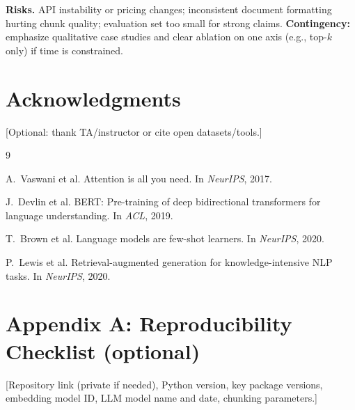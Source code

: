\documentclass[11pt,a4paper]{article}
\begin{document}
\textbf{Risks.} API instability or pricing changes; inconsistent document formatting hurting chunk quality; evaluation set too small for strong claims. \textbf{Contingency:} emphasize qualitative case studies and clear ablation on one axis (e.g., top-$k$ only) if time is constrained.

\section*{Acknowledgments}
[Optional: thank TA/instructor or cite open datasets/tools.]


\begin{thebibliography}{9}

A.~Vaswani et al.
\newblock Attention is all you need.
\newblock In \emph{NeurIPS}, 2017.

J.~Devlin et al.
\newblock BERT: Pre-training of deep bidirectional transformers for language understanding.
\newblock In \emph{ACL}, 2019.

T.~Brown et al.
\newblock Language models are few-shot learners.
\newblock In \emph{NeurIPS}, 2020.

P.~Lewis et al.
\newblock Retrieval-augmented generation for knowledge-intensive NLP tasks.
\newblock In \emph{NeurIPS}, 2020.

\end{thebibliography}

\appendix
\section*{Appendix A: Reproducibility Checklist (optional)}
[Repository link (private if needed), Python version, key package versions, embedding model ID, LLM model name and date, chunking parameters.]
\end{document}
